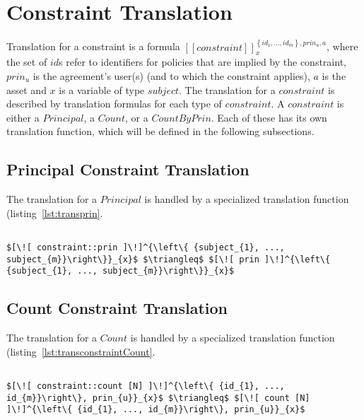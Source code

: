 \section{Constraint Translation}

Translation for a constraint is a formula $[\![constraint]\!]^{\left\{ {id_{1}, ..., id_{m}}\right\}, prin_{u}, a}_{x}$, where the set of $id$s refer to identifiers for policies that are implied by the constraint, $prin_{u}$ is the agreement's user(s) (and to which the constraint applies), $a$ is the asset and $x$ is a variable of type $subject$. The translation for a $constraint$ is described by translation formulas for each type of $constraint$. A $constraint$ is either a $Principal$, a $Count$, or a $CountByPrin$. Each of these has its own translation function, which will be defined in the following subsections.

\subsection{Principal Constraint Translation}
The translation for a $Principal$ is handled by a specialized translation function (listing~\ref{lst:transprin}.   

\lstset{mathescape, language=AST}  
\begin{lstlisting}[frame=single, caption={Constraint Translation {$\colon$} Principal},label={lst:transconstraintPrin}]

$[\![ constraint::prin ]\!]^{\left\{ {subject_{1}, ..., subject_{m}}\right\}}_{x}$ $\triangleq$ $[\![ prin ]\!]^{\left\{ {subject_{1}, ..., subject_{m}}\right\}}_{x}$ 
\end{lstlisting}

\subsection{Count Constraint Translation}
The translation for a $Count$ is handled by a specialized translation function (listing~\ref{lst:transconstraintCount}.

\lstset{mathescape, language=AST}  
\begin{lstlisting}[frame=single, caption={Constraint Translation {$\colon$} Count},label={lst:transconstraintCount}]

$[\![ constraint::count [N] ]\!]^{\left\{ {id_{1}, ..., id_{m}}\right\}, prin_{u}}_{x}$ $\triangleq$ $[\![ count [N] ]\!]^{\left\{ {id_{1}, ..., id_{m}}\right\}, prin_{u}}_{x}$ 
\end{lstlisting}

